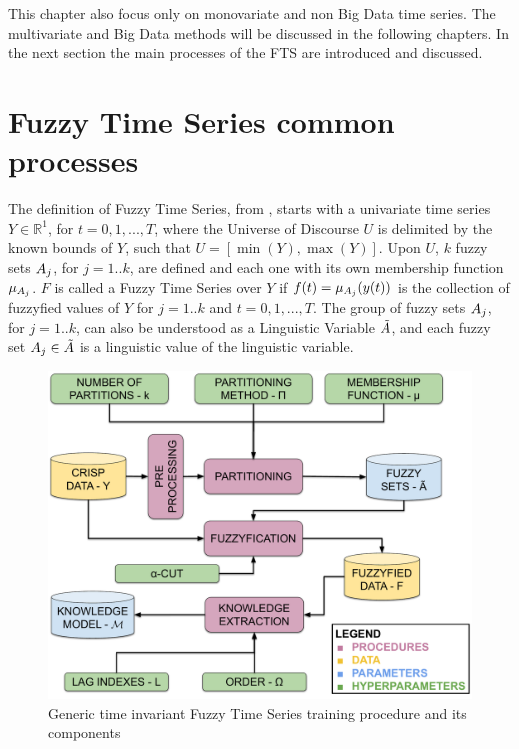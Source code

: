 This chapter also focus only on monovariate and non Big Data time series. The multivariate and Big Data methods will be discussed in the following chapters. In the next section the main processes of the FTS are introduced and discussed.


\section{Fuzzy Time Series common processes}
\label{sec:common_fts} 


The definition of Fuzzy Time Series, from \cite{song1993fuzzy}, starts with a univariate time series $Y \in \mathbb{R}^1$, for $t = 0,1,...,T$, where the Universe of Discourse $U$ is delimited by the known bounds of $Y$, such that $U = [\min(Y),\max(Y)]$. Upon $U$, $k$ fuzzy sets $A_j$, for $j = 1..k$, are defined and each one with its own membership function $\mu_{A_j}$. $F$ is called a Fuzzy Time Series over $Y$ if $f(t) = \mu_{A_j}(y(t))$ is the collection of fuzzyfied values of $Y$ for $j = 1..k$ and $t = 0,1,...,T$. The group of fuzzy sets $A_j$, for $j = 1..k$, can also be understood as a Linguistic Variable $\tilde{A}$, and each fuzzy set $A_j \in \tilde{A}$ is a linguistic value of the linguistic variable. 

\begin{figure}[htb]
    \centering
    \includegraphics[width=\textwidth]{figures/fts_training.pdf}
    \caption{Generic time invariant Fuzzy Time Series training procedure and its components}
    \label{fig:fts_training}
\end{figure}

